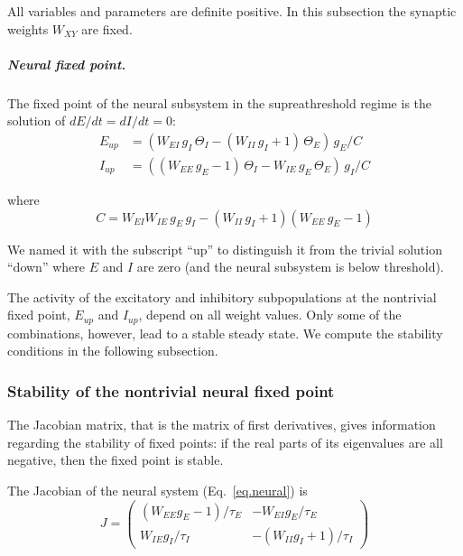 \documentclass[twocolumn]{article}
\newcommand{\EE}{\mathit{EE}}
\newcommand{\EI}{\mathit{EI}}
\newcommand{\IE}{\mathit{IE}}
\newcommand{\II}{\mathit{II}}
\newcommand{\up}{\mathit{up}}
\begin{document}
\noindent All variables and parameters are definite positive. In this subsection the synaptic weights $W_{\mathit{XY}}$ are fixed.

\subparagraph{Neural fixed point.} The fixed point of the neural subsystem in the supreathreshold regime is the solution of $dE/dt=dI/dt=0$:
\begin{equation}
\begin{aligned}
E_{\up} & = (W_{\EI} \, g_I \, \Theta_I - (W_{\II} \, g_I + 1) \, \Theta_E) \, g_E / C \\
I_{\up} & = ((W_{\EE} \, g_E - 1) \, \Theta_I - W_{\IE} \, g_E \, \Theta_E) \, g_I / C
\end{aligned}
\label{eq.upstate_orig}
\end{equation}

\noindent where
\begin{equation}
C = W_{\EI} W_{\IE} \, g_E\, g_I - (W_{\II} \, g_I + 1)(W_{\EE} \, g_E - 1)
\label{eq.den}
\end{equation}

\noindent We named it with the subscript ``up'' to distinguish it from the trivial solution ``down'' where $E$ and $I$ are zero (and the neural subsystem is below threshold).

The activity of the excitatory and inhibitory subpopulations at the nontrivial fixed point, $E_{\up}$ and $I_{\up}$, depend on all weight values. Only some of the combinations, however, lead to a stable steady state. We compute the stability conditions in the following subsection.


\subsubsection{Stability of the nontrivial neural fixed point}

The Jacobian matrix, that is the matrix of first derivatives, gives information regarding the stability of fixed points: if the real parts of its eigenvalues are all negative, then the fixed point is stable.

The Jacobian of the neural system (Eq.\ \ref{eq.neural}) is
\begin{equation}
J = \left(\begin{array}{rr}
(W_{\EE} g_E - 1)/\tau_E & -W_{\EI} g_E/\tau_E \\
W_{\IE} g_I/\tau_I & -(W_{\II} g_I + 1)/\tau_I
\end{array}\right)
\end{equation}
\end{document}
